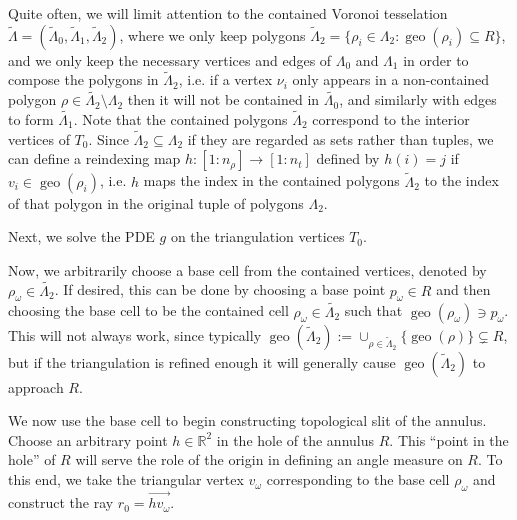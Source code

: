 \documentclass{article}
\DeclareMathOperator*{\geo}{\text{geo}}
\begin{document}
Quite often, we will limit attention to the contained Voronoi tesselation $\tilde{\Lambda} = (\tilde{\Lambda}_0, \tilde{\Lambda}_1, \tilde{\Lambda}_2)$, where we only keep polygons $\tilde{\Lambda}_2 = \{ \rho_i \in \Lambda_2 \colon \geo(\rho_i) \subseteq R \}$, and we only keep the necessary vertices and edges of $\Lambda_0$ and $\Lambda_1$ in order to compose the polygons in $\tilde{\Lambda}_2$, i.e. if a vertex $\nu_i$ only appears in a non-contained polygon $\rho \in \tilde{\Lambda_2} \setminus \Lambda_2$ then it will not be contained in $\tilde{\Lambda_0}$, and similarly with edges to form $\tilde{\Lambda_1}$. Note that the contained polygons $\tilde{\Lambda}_2$ correspond to the interior vertices of $T_0$. Since $\tilde{\Lambda}_2 \subseteq \Lambda_2$ if they are regarded as sets rather than tuples, we can define a reindexing map $h \colon [1 \colon n_\rho] \to [1 \colon n_t]$ defined by $h(i) = j$ if $v_i \in \geo(\rho_i)$, i.e. $h$ maps the index in the contained polygons $\tilde{\Lambda}_2$ to the index of that polygon in the original tuple of polygons $\Lambda_2$.

Next, we solve the PDE $g$ on the triangulation vertices $T_0$.

Now, we arbitrarily choose a base cell from the contained vertices, denoted by $\rho_\omega \in \tilde{\Lambda_2}$. If desired, this can be done by choosing a base point $p_\omega \in R$ and then choosing the base cell to be the contained cell $\rho_\omega \in \tilde{\Lambda_2}$ such that $\geo(\rho_\omega) \ni p_\omega$. This will not always work, since typically $\geo(\tilde{\Lambda}_2) := \cup_{\rho \in \tilde{\Lambda}_2} \{ \geo(\rho) \} \subsetneq R$, but if the triangulation is refined enough it will generally cause $\geo(\tilde{\Lambda}_2)$ to approach $R$.

We now use the base cell to begin constructing topological slit of the annulus. Choose an arbitrary point $h \in \mathbb{R}^2$ in the hole of the annulus $R$. This ``point in the hole'' of $R$ will serve the role of the origin in defining an angle measure on $R$. To this end, we take the triangular vertex $v_\omega$ corresponding to the base cell $\rho_\omega$ and construct the ray $r_0 = \overrightarrow{h v_\omega}$.
\end{document}
